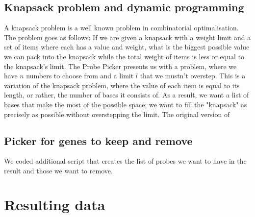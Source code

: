 \subsection{Knapsack problem and dynamic programming}
A knapsack problem is a well known problem in combinatorial optimalisation. The problem goes as follows: If we are given a knapsack with a weight limit and a 
set of items where each has a value and weight, what is the biggest possible value we can pack into the knapsack while the total weight of items is less or equal to 
the knapsack's limit. 
The Probe Picker presents us with a problem, where we have $n$ numbers to choose from and a limit $l$ that we mustn't overstep. This is a variation of the knapsack problem, 
where the value of each item is equal to its length, or rather, the number of bases it consists of. As a result, we want a list of bases that make the most of the possible space; 
we want to fill the "knapsack" as precisely as possible without overstepping the limit. 
The original version of 


\subsection{Picker for genes to keep and remove}
We coded additional script that creates the list of probes we want to have in the result and those we want to remove. 

\section{Resulting data}

